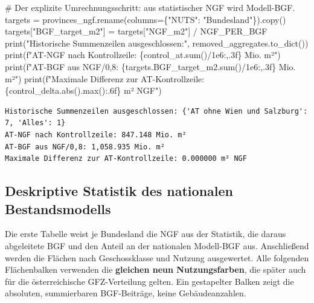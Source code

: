 \documentclass[
  ngerman,
  a4paper,
  DIV=11]{scrreprt}
\newenvironment{Shaded}{\begin{snugshade}}{\end{snugshade}}
\newcommand{\BuiltInTok}[1]{\textcolor[rgb]{0.00,0.23,0.31}{#1}}
\newcommand{\CommentTok}[1]{\textcolor[rgb]{0.37,0.37,0.37}{#1}}
\newcommand{\FloatTok}[1]{\textcolor[rgb]{0.68,0.00,0.00}{#1}}
\newcommand{\NormalTok}[1]{\textcolor[rgb]{0.00,0.23,0.31}{#1}}
\newcommand{\OperatorTok}[1]{\textcolor[rgb]{0.37,0.37,0.37}{#1}}
\newcommand{\SpecialCharTok}[1]{\textcolor[rgb]{0.37,0.37,0.37}{#1}}
\newcommand{\SpecialStringTok}[1]{\textcolor[rgb]{0.13,0.47,0.30}{#1}}
\newcommand{\StringTok}[1]{\textcolor[rgb]{0.13,0.47,0.30}{#1}}
\begin{document}
\begin{Shaded}
\begin{Highlighting}[]
\CommentTok{\# Der explizite Umrechnungsschritt: aus statistischer NGF wird Modell{-}BGF.}
\NormalTok{targets }\OperatorTok{=}\NormalTok{ provinces\_ngf.rename(columns}\OperatorTok{=}\NormalTok{\{}\StringTok{"NUTS"}\NormalTok{: }\StringTok{"Bundesland"}\NormalTok{\}).copy()}
\NormalTok{targets[}\StringTok{"BGF\_target\_m2"}\NormalTok{] }\OperatorTok{=}\NormalTok{ targets[}\StringTok{"NGF\_m2"}\NormalTok{] }\OperatorTok{/}\NormalTok{ NGF\_PER\_BGF}
\BuiltInTok{print}\NormalTok{(}\StringTok{"Historische Summenzeilen ausgeschlossen:"}\NormalTok{, removed\_aggregates.to\_dict())}
\BuiltInTok{print}\NormalTok{(}\SpecialStringTok{f"AT{-}NGF nach Kontrollzeile: }\SpecialCharTok{\{}\NormalTok{control\_at}\SpecialCharTok{.}\BuiltInTok{sum}\NormalTok{()}\OperatorTok{/}\FloatTok{1e6}\SpecialCharTok{:,.3f\}}\SpecialStringTok{ Mio. m²"}\NormalTok{)}
\BuiltInTok{print}\NormalTok{(}\SpecialStringTok{f"AT{-}BGF aus NGF/0,8: }\SpecialCharTok{\{}\NormalTok{targets}\SpecialCharTok{.}\NormalTok{BGF\_target\_m2}\SpecialCharTok{.}\BuiltInTok{sum}\NormalTok{()}\OperatorTok{/}\FloatTok{1e6}\SpecialCharTok{:,.3f\}}\SpecialStringTok{ Mio. m²"}\NormalTok{)}
\BuiltInTok{print}\NormalTok{(}\SpecialStringTok{f"Maximale Differenz zur AT{-}Kontrollzeile: }\SpecialCharTok{\{}\NormalTok{control\_delta}\SpecialCharTok{.}\BuiltInTok{abs}\NormalTok{()}\SpecialCharTok{.}\BuiltInTok{max}\NormalTok{()}\SpecialCharTok{:.6f\}}\SpecialStringTok{ m² NGF"}\NormalTok{)}
\end{Highlighting}
\end{Shaded}

\begin{verbatim}
Historische Summenzeilen ausgeschlossen: {'AT ohne Wien und Salzburg': 7, 'Alles': 1}
AT-NGF nach Kontrollzeile: 847.148 Mio. m²
AT-BGF aus NGF/0,8: 1,058.935 Mio. m²
Maximale Differenz zur AT-Kontrollzeile: 0.000000 m² NGF
\end{verbatim}

\subsection{Deskriptive Statistik des nationalen
Bestandsmodells}\label{deskriptive-statistik-des-nationalen-bestandsmodells}

Die erste Tabelle weist je Bundesland die NGF aus der Statistik, die
daraus abgeleitete BGF und den Anteil an der nationalen Modell-BGF aus.
Anschließend werden die Flächen nach Geschossklasse und Nutzung
ausgewertet. Alle folgenden Flächenbalken verwenden die \textbf{gleichen
neun Nutzungsfarben}, die später auch für die österreichische
GFZ-Verteilung gelten. Ein gestapelter Balken zeigt die absoluten,
summierbaren BGF-Beiträge, keine Gebäudeanzahlen.
\end{document}
